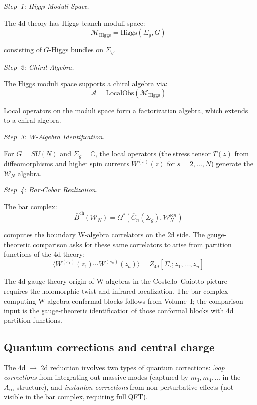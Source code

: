 \begin{remark}
\emph{Step~1: Higgs Moduli Space.}

The 4d theory has Higgs branch moduli space:
\[\mathcal{M}_{\text{Higgs}} = \text{Higgs}(\Sigma_g, G)\]

consisting of $G$-Higgs bundles on $\Sigma_g$.

\emph{Step~2: Chiral Algebra.}

The Higgs moduli space supports a chiral algebra via:
\[\mathcal{A} = \text{LocalObs}(\mathcal{M}_{\text{Higgs}})\]

Local operators on the moduli space form a factorization algebra, which extends
to a chiral algebra.

\emph{Step~3: W-Algebra Identification.}

For $G = SU(N)$ and $\Sigma_g = \mathbb{C}$, the local operators (the stress tensor $T(z)$ from diffeomorphisms and higher spin currents $W^{(s)}(z)$ for $s = 2, \ldots, N$) generate the $\mathcal{W}_N$ algebra.

\emph{Step~4: Bar-Cobar Realization.}

The bar complex:
\[\bar{B}^{\text{ch}}(\mathcal{W}_N) = \Omega^*(\overline{C}_n(\Sigma_g),
\mathcal{W}_N^{\boxtimes n})\]

computes the boundary W-algebra correlators on the 2d side. The
gauge-theoretic comparison asks for these same correlators to arise
from partition functions of the 4d theory:
\[\langle W^{(s_1)}(z_1) \cdots W^{(s_n)}(z_n) \rangle =
Z_{4d}[\Sigma_g; z_1, \ldots, z_n]\]
\end{remark}

\begin{remark}
The 4d gauge theory origin of W-algebras in the Costello--Gaiotto
picture requires the holomorphic twist and infrared localization. The
bar complex computing W-algebra conformal blocks follows from Volume~I;
the comparison input is the gauge-theoretic identification of those
conformal blocks with 4d partition functions.
\end{remark}

\subsection{Quantum corrections and central charge}

\begin{remark}
The 4d $\to$ 2d reduction involves two types of quantum corrections: \emph{loop corrections} from integrating out massive modes (captured by $m_3, m_4, \ldots$ in the $A_\infty$ structure), and \emph{instanton corrections} from non-perturbative effects (not visible in the bar complex, requiring full QFT).
\end{remark}

